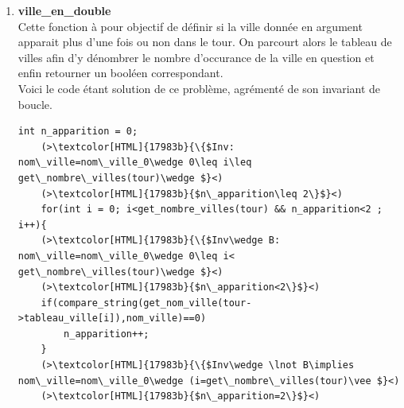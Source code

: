 \documentclass[a4paper, 11pt, oneside]{article}
\begin{document}
\begin{enumerate}
    \begin{lstlisting}[caption = {code boucle trouver ville correspondante}]
    int i = 0;
    (>\textcolor[HTML]{17983b}{\{$Inv: nom\_ville=nom\_ville_0\wedge 0\leq i\leq get\_nombre\_villes(tour)$\}}<)
    for(; i<get_nombre_villes(tour) && ville_appartient_tour==0; i++){
        (>\textcolor[HTML]{17983b}{\{$Inv\wedge B: nom\_ville=nom\_ville_0\wedge $}<)
        (>\textcolor[HTML]{17983b}{$0\leq i< get\_nombre\_villes(tour)\wedge ville\_appartient\_tour=0$\}}<)
        nom2 = get_nom_ville(tour->tableau_ville[i]);
        if(!compare_string(nom_ville, nom2)){
            ville_appartient_tour = 1;
            /*décrémente i de 1 car sera à nouveau incrémenter en fin de 
            boucle malgré que la boucle s'arrête dû à 
            ville_appartient_tour=1, ainsi i sera bien l'indice du tableau 
            où trouver la ville après la boucle*/
            i--;
        }
    }    
    (>\textcolor[HTML]{17983b}{\{$Inv\wedge \lnot B \implies nom\_ville=nom\_ville_0\wedge $}<)
    (>\textcolor[HTML]{17983b}{$(i=get\_nombre\_villes(tour)\vee (ville\_appartient\_tour=1\wedge 0\leq i< get\_nombre\_villes(tour)))$\}}<)
    \end{lstlisting}
    \item \textbf{ville\_en\_double}
    \\Cette fonction à pour objectif de définir si la ville donnée en argument apparait plus d'une fois 
    ou non dans le tour. On parcourt alors le tableau de villes afin d'y dénombrer le nombre d'occurance
    de la ville en question et enfin retourner un booléen correspondant.
    \\Voici le code étant solution de ce problème, agrémenté de son invariant de boucle.
    \begin{lstlisting}[caption = {code boucle nombre d'apparition d'une ville}]
    int n_apparition = 0;
    (>\textcolor[HTML]{17983b}{\{$Inv: nom\_ville=nom\_ville_0\wedge 0\leq i\leq get\_nombre\_villes(tour)\wedge $}<)
    (>\textcolor[HTML]{17983b}{$n\_apparition\leq 2\}$}<)
    for(int i = 0; i<get_nombre_villes(tour) && n_apparition<2 ; i++){
    (>\textcolor[HTML]{17983b}{\{$Inv\wedge B: nom\_ville=nom\_ville_0\wedge 0\leq i< get\_nombre\_villes(tour)\wedge $}<)
    (>\textcolor[HTML]{17983b}{$n\_apparition<2\}$}<)
    if(compare_string(get_nom_ville(tour->tableau_ville[i]),nom_ville)==0)
        n_apparition++;
    } 
    (>\textcolor[HTML]{17983b}{\{$Inv\wedge \lnot B\implies nom\_ville=nom\_ville_0\wedge (i=get\_nombre\_villes(tour)\vee $}<)
    (>\textcolor[HTML]{17983b}{$n\_apparition=2\}$}<)    
    \end{lstlisting}
\end{enumerate}
\end{document}
